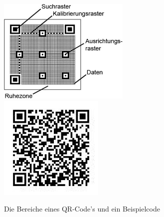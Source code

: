 \begin{figure}[H]
  \centering
  \includegraphics[height=5cm]{img/QR/Aufbau_qr-codes.jpg}
  \includegraphics[height=5cm]{img/QR/perfect_03.jpg}
  \caption{Die Bereiche eines QR-Code's und ein Beispielcode}
  \label{fig:qrexample}
\end{figure}


